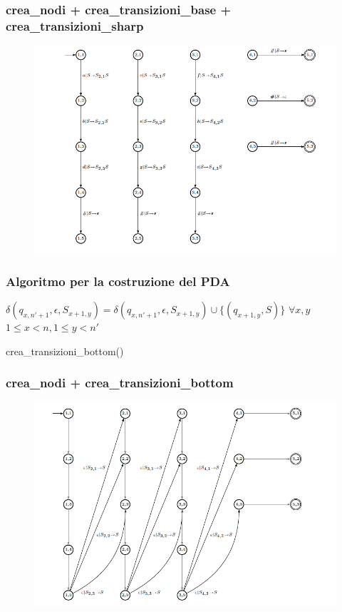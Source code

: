 \documentclass{beamer}
\begin{document}
\begin{frame}
\frametitle{crea\_nodi + crea\_transizioni\_base + crea\_transizioni\_sharp}
\begin{figure}[p]
    \includegraphics[width=1\textwidth]{pda_1.png}
\end{figure}
\end{frame}


\begin{frame}
\frametitle{Algoritmo per la costruzione del PDA}
\begin{algorithm}[H]
\begin{algorithmic}[1]
	\STATE $\delta(q_{x,n'+1},\epsilon,S_{x+1,y}) = \delta(q_{x,n'+1},\epsilon,S_{x+1,y}) \cup \{(q_{x+1,y},S)\}$
	\STATE  $\forall x,y$ $1 \leq x < n, 1\leq y < n'$
\end{algorithmic}
\caption{crea\_transizioni\_bottom()}
\end{algorithm}
\end{frame}


\begin{frame}
\frametitle{crea\_nodi + crea\_transizioni\_bottom}
\begin{figure}[p]
    \includegraphics[width=1\textwidth]{pda_2.png}
\end{figure}
\end{frame}
\end{document}
